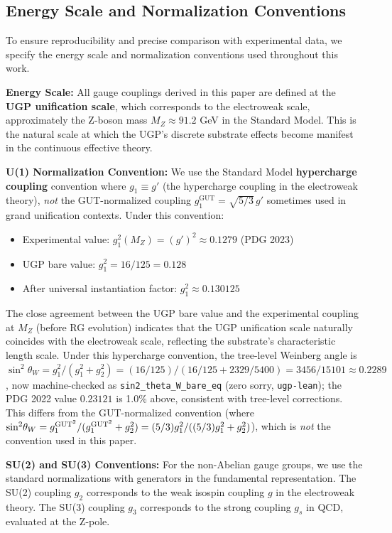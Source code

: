 \documentclass[11pt,twocolumn]{article}
\begin{document}
\subsection{Energy Scale and Normalization Conventions}

To ensure reproducibility and precise comparison with experimental data, we specify the energy scale and normalization conventions used throughout this work.

\textbf{Energy Scale:} All gauge couplings derived in this paper are defined at the \textbf{UGP unification scale}, which corresponds to the electroweak scale, approximately the Z-boson mass $M_Z \approx 91.2$ GeV in the Standard Model. This is the natural scale at which the UGP's discrete substrate effects become manifest in the continuous effective theory.

\textbf{U(1) Normalization Convention:}
We use the Standard Model \textbf{hypercharge coupling} convention where $g_1 \equiv g'$ (the hypercharge coupling in the electroweak theory), \emph{not} the GUT-normalized coupling $g_1^{\text{GUT}} = \sqrt{5/3} \, g'$ sometimes used in grand unification contexts. Under this convention:
\begin{itemize}[leftmargin=1.2em,itemsep=0.2em]
    \item Experimental value: $g_1^2(M_Z) = (g')^2 \approx 0.1279$ (PDG 2023)
    \item UGP bare value: $g_1^2 = 16/125 = 0.128$
    \item After universal instantiation factor: $g_1^2 \approx 0.130125$
\end{itemize}

The close agreement between the UGP bare value and the experimental coupling at $M_Z$ (before RG evolution) indicates that the UGP unification scale naturally coincides with the electroweak scale, reflecting the substrate's characteristic length scale.  Under this hypercharge convention, the tree-level Weinberg angle is $\sin^2\!\theta_W = g_1^2/(g_1^2+g_2^2) = (16/125)/(16/125 + 2329/5400) = 3456/15101 \approx 0.2289$, now machine-checked as \texttt{sin2\_theta\_W\_bare\_eq} (zero sorry, \texttt{ugp-lean}); the PDG 2022 value $0.23121$ is 1.0\% above, consistent with tree-level corrections.  This differs from the GUT-normalized convention (where $\sin^2\!\theta_W = g_1^{\rm GUT^2}/(g_1^{\rm GUT^2}+g_2^2) = (5/3) g_1^2/((5/3)g_1^2+g_2^2)$), which is \emph{not} the convention used in this paper.

\textbf{SU(2) and SU(3) Conventions:}
For the non-Abelian gauge groups, we use the standard normalizations with generators in the fundamental representation. The SU(2) coupling $g_2$ corresponds to the weak isospin coupling $g$ in the electroweak theory. The SU(3) coupling $g_3$ corresponds to the strong coupling $g_s$ in QCD, evaluated at the Z-pole.
\end{document}
